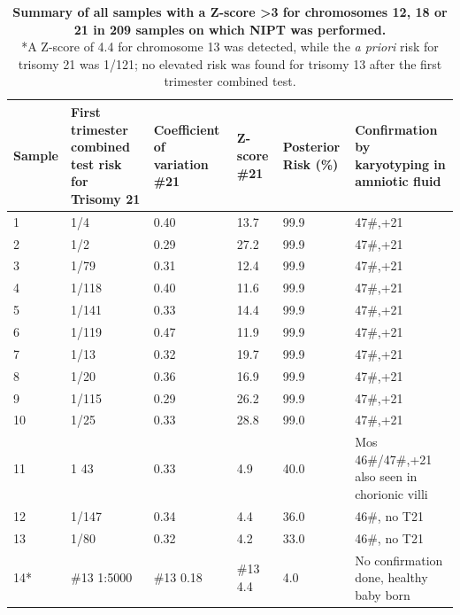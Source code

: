 \begin{table}
	\begin{tabular}{ p{1cm} p{3cm} p{1.9cm} p{1.9cm} p{1.5cm} p{2cm} }
		\footnotesize{Sample} & \footnotesize{First trimester combined test risk for Trisomy 21} & \footnotesize{Coefficient of variation \#21} & \footnotesize{Z-score \#21} & \footnotesize{Posterior Risk (\%)} & \footnotesize{Confirmation by karyotyping in amniotic fluid} \\
		\hline
		1 & 1/4          & 0.40      & 13.7     & 99.9 & 47\#,+21 \\
		2 & 1/2          & 0.29      & 27.2     & 99.9 & 47\#,+21 \\
		3 & 1/79         & 0.31      & 12.4     & 99.9 & 47\#,+21 \\
		4 & 1/118        & 0.40      & 11.6     & 99.9 & 47\#,+21 \\
		5 & 1/141        & 0.33      & 14.4     & 99.9 & 47\#,+21 \\
		6 & 1/119        & 0.47      & 11.9     & 99.9 & 47\#,+21 \\
		7 & 1/13         & 0.32      & 19.7     & 99.9 & 47\#,+21 \\
		8 & 1/20         & 0.36      & 16.9     & 99.9 & 47\#,+21 \\
		9 & 1/115        & 0.29      & 26.2     & 99.9 & 47\#,+21 \\
		10 & 1/25        & 0.33      & 28.8     & 99.0 & 47\#,+21 \\
		11 & 1 43        & 0.33      & 4.9      & 40.0 & Mos 46\#/47\#,+21 \footnotesize{also seen in chorionic villi}\\
		12 & 1/147       & 0.34      & 4.4      & 36.0 & 46\#, no T21 \\
		13 & 1/80        & 0.32      & 4.2      & 33.0 & 46\#, no T21 \\
		14* & \#13 1:5000 & \#13 0.18 & \#13 4.4 & 4.0  & \footnotesize{No confirmation done, healthy baby born}\\
		\hline
	\end{tabular}
	\caption[NIPTRIC Post-test probability summary table]{\label{table:summary} \textbf{Summary of all samples with a Z-score \textgreater 3 for chromosomes 12, 18 or 21 in 209 samples on which NIPT was performed.} \\
	*A Z-score of 4.4 for chromosome 13 was detected, while the \textsl{a priori} risk for trisomy 21 was 1/121; no elevated risk was found for trisomy 13 after the first trimester combined test.}
\end{table}

